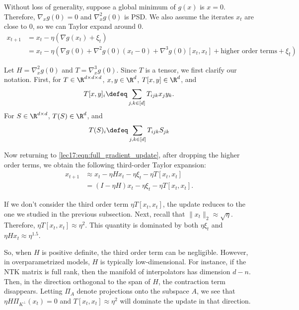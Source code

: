 Without loss of generality, suppose a global minimum of $g(x)$ is $x=0$. Therefore, $\nabla_x g(0) = 0$ and $\nabla_x^2 g(0)$ is PSD. We also assume the iterates $x_t$ are close to $0$, so we can Taylor expand around $0$.
\begin{align}
x_{t+1} &= x_t - \eta(\nabla g(x_t) + \xi_t)\\
&= x_t - \eta(\nabla g(0) + \nabla^2g(0)(x_t - 0) + \nabla^3g(0)[x_t,x_t] + \text{higher order terms} + \xi_t). \label{lec17:eqn:full_gradient_update}
\end{align}

Let $H = \nabla^2_x g(0)$ and $T = \nabla^3_x g(0)$. Since $T$ is a tensor, we first clarify our notation. First, for $T \in \R^{d\times d\times d}$, $x,y \in \R^{d}$, $T[x,y]\in \R^d$, and 
\begin{align}\label{lec17:eqn:tensor}
    T[x,y]_i \defeq \sum_{j,k\in[d]}T_{ijk}x_jy_k.
\end{align} 
For $S\in \R^{d\times d}$, $T(S)\in \R^d$, and 
\begin{align} \label{lec17:eqn:tensor1}
    T(S)_i \defeq \sum_{j,k\in[d]}T_{ijk}S_{jk}
\end{align} 

Now returning to \eqref{lec17:eqn:full_gradient_update}, after dropping the higher order terms, we obtain the following third-order Taylor expansion:
\begin{align}
x_{t+1} &\approx x_t - \eta Hx_t - \eta\xi_t - \eta T[x_t,x_t]\\
&= (I-\eta H)x_t - \eta \xi_t - \eta T [x_t,x_t].\label{lec17:eqn:iterate}
\end{align}

If we don't consider the third order term $\eta T [x_t,x_t]$, the update reduces to the one we studied in the previous subsection. Next, recall that $\|x_t\|_2 \approx \sqrt{\eta}$. Therefore, $\eta T[x_t,x_t] \approx \eta^2$. This quantity is dominated by both $\eta \xi_t$ and $\eta Hx_t \approx {\eta}^{1.5}$. 

So, when $H$ is positive definite, the third order term can be negligible. However, in overparametrized models, $H$ is typically low-dimensional. For instance, if the NTK matrix is full rank, then the manifold of interpolators has dimension $d-n$. Then, in the direction orthogonal to the span of $H$, the contraction term disappears. Letting $\Pi_{A}$ denote projections onto the subspace $A$, we see that $\eta H \Pi_{K^\perp}(x_t) = 0$ and $T[x_t,x_t] \approx \eta^2$ will dominate the update in that direction.

